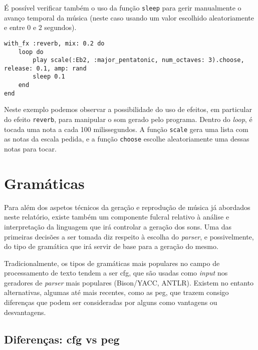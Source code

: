 É possível verificar também o uso da função \texttt{sleep} para gerir manualmente o avanço temporal da música (neste caso usando um valor escolhido aleatoriamente e entre 0 e 2 segundos).


\begin{lstlisting}[caption={Reproduzir um notas de uma escala aleatórias, com efeito \textit{reverb}}] 
with_fx :reverb, mix: 0.2 do
    loop do
        play scale(:Eb2, :major_pentatonic, num_octaves: 3).choose, release: 0.1, amp: rand
        sleep 0.1
    end
end
\end{lstlisting}
Neste exemplo podemos observar a possibilidade do uso de efeitos, em particular do efeito \texttt{reverb}, para manipular o som gerado pelo programa. Dentro do \textit{loop}, é tocada uma nota a cada 100 milissegundos. A função \texttt{scale} gera uma lista com as notas da escala pedida, e a função \texttt{choose} escolhe aleatoriamente uma dessas notas para tocar.
    
\section{Gramáticas}


Para além dos aspetos técnicos da geração e reprodução de música já abordados neste relatório, existe também um componente fulcral relativo à análise e interpretação da linguagem que irá controlar a geração dos sons. Uma das primeiras decisões a ser tomada diz respeito à escolha do \textit{parser}, e possivelmente, do tipo de gramática que irá servir de base para a geração do mesmo.

Tradicionalmente, os tipos de gramáticas mais populares no campo de processamento de texto tendem a ser \acrfull{cfg}, que são usadas como \textit{input} nos geradores de \textit{parser} mais populares (Bison/YACC, ANTLR). Existem no entanto alternativas, algumas até mais recentes, como as \acrfull{peg}, que trazem consigo diferenças que podem ser consideradas por alguns como vantagens ou desvantagens.

\subsection{Diferenças: \acrshort{cfg} vs \acrshort{peg}}

